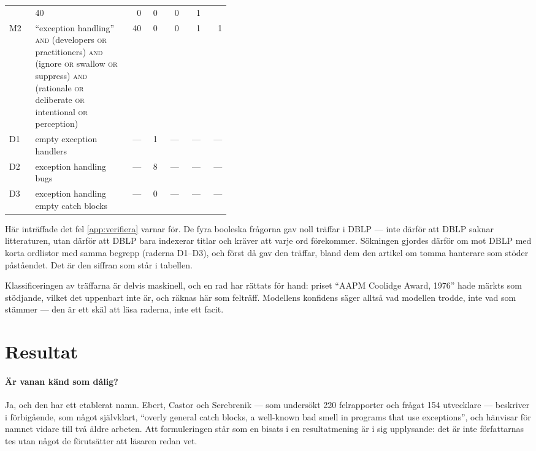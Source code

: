 \begin{table}[htbp]
\begin{tabular}{@{}lp{0.42\linewidth}rrrrr@{}}
      & 40 & 0 & 0 & 0 & 1 \\
    M2 & \enquote{exception handling} \textsc{and} (developers
      \textsc{or} practitioners) \textsc{and} (ignore \textsc{or}
      swallow \textsc{or} suppress) \textsc{and} (rationale \textsc{or}
      deliberate \textsc{or} intentional \textsc{or} perception)
      & 40 & 0 & 0 & 1 & 1 \\
    D1 & empty exception handlers & --- & 1 & --- & --- & --- \\
    D2 & exception handling bugs & --- & 8 & --- & --- & --- \\
    D3 & exception handling empty catch blocks
      & --- & 0 & --- & --- & --- \\
    \bottomrule
  \end{tabular}
\end{table}

Här inträffade det fel \cref{app:verifiera} varnar för.  De fyra
booleska frågorna gav noll träffar i DBLP --- inte därför att DBLP saknar
litteraturen, utan därför att DBLP bara indexerar titlar och kräver att
varje ord förekommer.  Sökningen gjordes därför om mot DBLP med korta
ordlistor med samma begrepp (raderna D1--D3), och först då gav den
träffar, bland dem den artikel om tomma hanterare som stöder
påståendet.  Det är den siffran som står i tabellen.

Klassificeringen av träffarna är delvis maskinell, och en rad har
rättats för hand: priset \enquote{AAPM Coolidge Award, 1976} hade
märkts som stödjande, vilket det uppenbart inte är, och räknas här som
felträff.  Modellens konfidens säger alltså vad modellen trodde, inte
vad som stämmer --- den är ett skäl att läsa raderna, inte ett facit.

\section{Resultat}
\label{sec:ca-resultat}

\paragraph{Är vanan känd som dålig?}
Ja, och den har ett etablerat namn.  Ebert, Castor och Serebrenik ---
som undersökt 220 felrapporter och frågat 154 utvecklare --- beskriver i
förbigående, som något självklart, \enquote{overly general catch blocks,
a well-known bad smell in programs that use
exceptions}\autocite[83]{EbertCastor2015}, och hänvisar för namnet
vidare till två äldre arbeten.  Att formuleringen står som en bisats i en
resultatmening är i sig upplysande: det är inte författarnas tes utan
något de förutsätter att läsaren redan vet.

